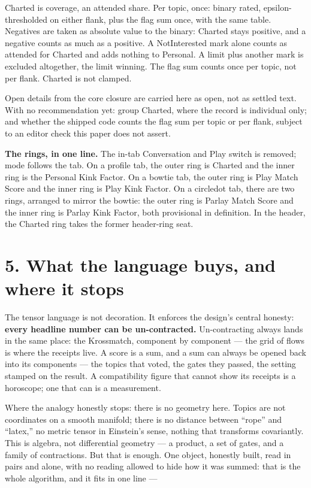 Charted is coverage, an attended share. Per topic, once: binary rated,
epsilon-thresholded on either flank, plus the flag sum once, with the
same table. Negatives are taken as absolute value to the binary: Charted
stays positive, and a negative counts as much as a positive. A
NotInterested mark alone counts as attended for Charted and adds nothing
to Personal. A limit plus another mark is excluded altogether, the limit
winning. The flag sum counts once per topic, not per flank. Charted is
not clamped.

Open details from the core closure are carried here as open, not as
settled text. With no recommendation yet: group Charted, where the
record is individual only; and whether the shipped code counts the flag
sum per topic or per flank, subject to an editor check this paper does
not assert.

\textbf{The rings, in one line.} The in-tab Conversation and Play switch
is removed; mode follows the tab. On a profile tab, the outer ring is
Charted and the inner ring is the Personal Kink Factor. On a bowtie tab,
the outer ring is Play Match Score and the inner ring is Play Kink
Factor. On a circledot tab, there are two rings, arranged to mirror the
bowtie: the outer ring is Parlay Match Score and the inner ring is
Parlay Kink Factor, both provisional in definition. In the header, the
Charted ring takes the former header-ring seat.

\section{5. What the language buys, and where it
stops}\label{what-the-language-buys-and-where-it-stops}

The tensor language is not decoration. It enforces the design's central
honesty: \textbf{every headline number can be un-contracted.}
Un-contracting always lands in the same place: the Krossmatch, component
by component --- the grid of flows is where the receipts live. A score
is a sum, and a sum can always be opened back into its components ---
the topics that voted, the gates they passed, the setting stamped on the
result. A compatibility figure that cannot show its receipts is a
horoscope; one that can is a measurement.

Where the analogy honestly stops: there is no geometry here. Topics are
not coordinates on a smooth manifold; there is no distance between
``rope'' and ``latex,'' no metric tensor in Einstein's sense, nothing
that transforms covariantly. This is algebra, not differential geometry
--- a product, a set of gates, and a family of contractions. But that is
enough. One object, honestly built, read in pairs and alone, with no
reading allowed to hide how it was summed: that is the whole algorithm,
and it fits in one line ---

